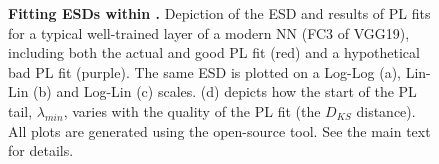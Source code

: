 \begin{figure}[t] %
    \centering
    \caption{\textbf{Fitting ESDs within \HTSR.} 
             Depiction of the ESD and results of PL fits for a typical well-trained layer of a modern NN (FC3 of VGG19), including both the actual and good PL fit (red) and a hypothetical bad PL fit (purple). 
             The same ESD is plotted on a Log-Log (a), Lin-Lin (b) and Log-Lin (c) scales.
             (d) depicts how the start of the PL tail, $\lambda_{min}$, varies with the quality of the PL fit (the $D_{KS}$ distance). 
             All plots are generated using the open-source \WW tool. 
             See the main text for details.
            }
  \label{fig:log-esds}
\end{figure}   


